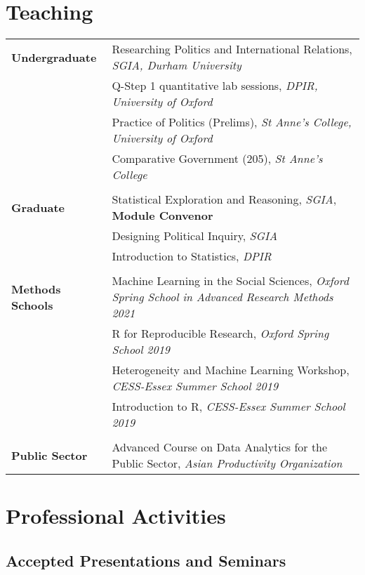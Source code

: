 \documentclass[11pt, a4paper]{article}
\begin{document}
 \section*{Teaching}

  \begin{tabular}{p{}|p{}}
     \textbf{Undergraduate} 
      & Researching Politics and International Relations, \textit{SGIA, Durham University}\\
      & Q-Step 1 quantitative lab sessions, \textit{DPIR, University of Oxford} \\
      & Practice of Politics (Prelims), \textit{St Anne's College, University of Oxford}\\
      & Comparative Government (205), \textit{St Anne's College} \\
      & \\
      \textbf{Graduate} 
      & Statistical Exploration and Reasoning, \textit{SGIA}, \textbf{Module Convenor} \\
      & Designing Political Inquiry, \textit{SGIA} \\
      &  Introduction to Statistics, \textit{DPIR} \\
      & \\
      \textbf{Methods Schools} & Machine Learning in the Social Sciences, \textit{Oxford Spring School in Advanced Research Methods 2021} \\
      & R for Reproducible Research, \textit{Oxford Spring School 2019} \\
      & Heterogeneity and Machine Learning Workshop, \textit{CESS-Essex Summer School 2019} \\
      & Introduction to R, \textit{CESS-Essex Summer School 2019} \\
      & \\
      \textbf{Public Sector} 
      & Advanced Course on Data Analytics for the Public Sector, \textit{Asian Productivity Organization} \\
 \end{tabular}

 \section*{Professional Activities}

 \subsection*{Accepted Presentations and Seminars}
\end{document}
